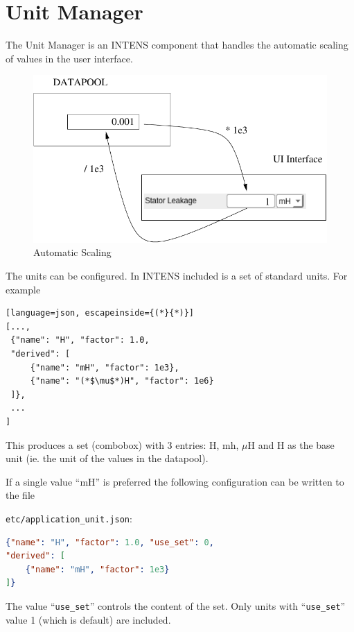 \section{Unit Manager} \label{sec:unitmanager}

The Unit Manager is an INTENS component that handles the automatic
scaling of values in the user interface.

\begin{figure}[h]\label{fig:unitmanager}
  \begin{center}
    \includegraphics[width=0.7\linewidth]{xfig/unitmanager}
  \end{center}
  \caption{Automatic Scaling}
\end{figure}

The units can be configured. In INTENS included is a set of
standard units. For example
\begin{lstlisting}[language=json, escapeinside={(*}{*)}]
[...,
 {"name": "H", "factor": 1.0,
 "derived": [
     {"name": "mH", "factor": 1e3},
     {"name": "(*$\mu$*)H", "factor": 1e6}
 ]},
 ...
]
\end{lstlisting}
This produces a set (combobox) with 3 entries: H, mh, $\mu$H
and H as the base unit (ie. the unit of the values in the datapool).

If a single value ``mH'' is preferred the following configuration
can be written to the file

\verb+etc/application_unit.json+:
\begin{lstlisting}[language=json]
{"name": "H", "factor": 1.0, "use_set": 0,
"derived": [
    {"name": "mH", "factor": 1e3}
]}
\end{lstlisting}
The value ``\verb+use_set+'' controls the content of the set.
Only units with ``\verb+use_set+'' value 1 (which is default)
are included.
